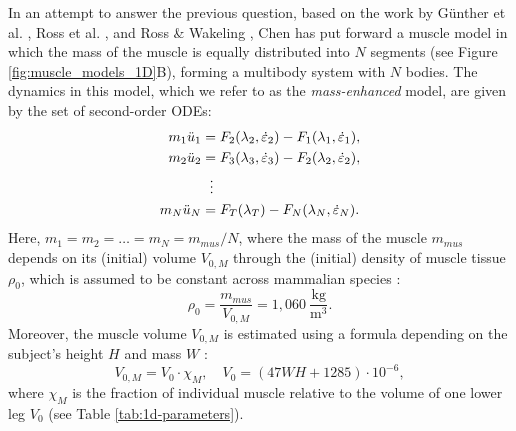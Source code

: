 \documentclass{sfuthesis}
\numberwithin{equation}{section}
\numberwithin{figure}{chapter}
\numberwithin{table}{chapter}
\theoremstyle{definition}
\newcommand{\depsilon}{\dot{\varepsilon}}
\begin{document}
In an attempt to answer the previous question, based on the work by G\"{u}nther et al. \cite{Gunther2012}, Ross et al. \cite{Ross2018}, and Ross \& Wakeling \cite{RossWakeling2016Multibody, Paper4_RossWakeling2021}, Chen \cite{EvanThesis} has put forward a muscle model in which the mass of the muscle is equally distributed into $N$ segments (see Figure \ref{fig:muscle_models_1D}B), forming a multibody system with $N$ bodies. The dynamics in this model, which we refer to as the \textit{mass-enhanced} model, are given by the set of second-order ODEs:
\begin{subequations} \label{eq:massenhanced_model}
    \begin{align}
        m_1 \ddot{u}_1 &= F_2(\lambda_2, \depsilon_2) - F_1(\lambda_1, \depsilon_1), \\
        m_2 \ddot{u}_2 &= F_3(\lambda_3, \depsilon_3) - F_2(\lambda_2, \depsilon_2), \\
        &\hspace{0.6em} \vdots \notag \\
        m_N \ddot{u}_N &= F_T(\lambda_T) - F_N(\lambda_N, \depsilon_N).
    \end{align}
\end{subequations}
Here, $m_1 = m_2 = \dots = m_N = m_{mus}/N$, where the mass of the muscle $m_{mus}$ depends on its (initial) volume $V_{0,M}$ through the (initial) density of muscle tissue $\rho_0$, which is assumed to be constant across mammalian species \cite{MendezKeys1960}:
\begin{equation}
    \rho_0 = \dfrac{m_{mus}}{V_{0,M}} = 1,060 \ \dfrac{\text{kg}}{\text{m}^3}.
\end{equation}
Moreover, the muscle volume $V_{0,M}$ is estimated using a formula depending on the subject's height $H$ and mass $W$ \cite{Hansfield2014}:
\begin{equation}
    V_{0,M} = V_0 \cdot \chi_M, \quad V_0 = (47WH + 1285) \cdot 10^{-6},
\end{equation}
where $\chi_M$ is the fraction of individual muscle relative to the volume of one lower leg $V_0$ (see Table \ref{tab:1d-parameters}).
\end{document}
